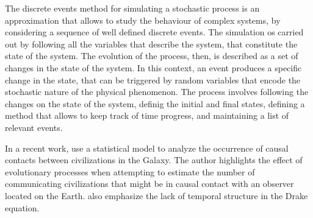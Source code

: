 \documentclass[crop]{CSLB}%
\begin{document}
The discrete events method for simulating a stochastic process is an
approximation that allows to study the behaviour of complex
systems, by considering a sequence of well defined discrete events.
%
The simulation os carried out by following all the variables that
describe the system, that constitute the state of the system.
%
The evolution of the process, then, is described as a set of changes
in the state of the system.
%
In this context, an event produces a specific change in the state,
that can be triggered by random variables that encode the stochastic
nature of the physical phenomenon.
%
The process involves following the changes on the state of the system,
definig the initial and final states, defining a method that allows to
keep track of time progress, and maintaining a list of relevant
events.


In a recent work, \citep{balbi_impact_2018} use a statistical model to analyze
the occurrence of causal contacts between civilizations in the Galaxy.
%
The author highlights the effect of evolutionary processes when
attempting to estimate the number of communicating civilizations that
might be in causal contact with an observer located on the Earth.
%
\citet{cirkovic_temporal_2004} also emphasize the lack of temporal
structure in the Drake equation.



\end{document}
